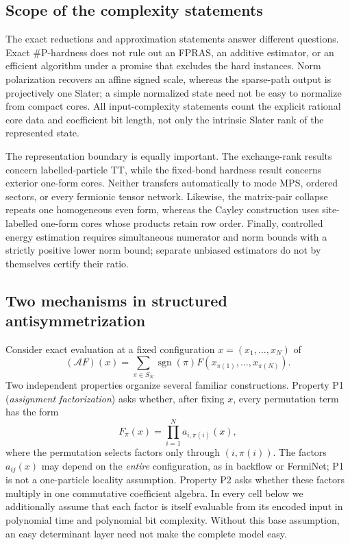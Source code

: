 \documentclass[aps,pra,reprint,superscriptaddress,nofootinbib,longbibliography,showkeys]{revtex4-2}
\theoremstyle{definition}
\begin{document}
\subsection{Scope of the complexity statements}

The exact reductions and approximation statements answer different questions.
Exact \#P-hardness does not rule out an FPRAS, an additive estimator, or an
efficient algorithm under a promise that excludes the hard instances.  Norm
polarization recovers an affine signed scale, whereas the sparse-path output is
projectively one Slater; a simple normalized state need not be easy to
normalize from compact cores.  All input-complexity statements count the
explicit rational core data and coefficient bit length, not only the intrinsic
Slater rank of the represented state.

The representation boundary is equally important.  The exchange-rank results
concern labelled-particle TT, while the fixed-bond hardness result concerns
exterior one-form cores.  Neither transfers automatically to mode MPS,
ordered sectors, or every fermionic tensor network.  Likewise, the
matrix-pair collapse repeats one homogeneous even form, whereas the Cayley
construction uses site-labelled one-form cores whose products retain row
order.  Finally, controlled energy estimation requires simultaneous numerator
and norm bounds with a strictly positive lower norm bound; separate unbiased
estimators do not by themselves certify their ratio.

\subsection{Two mechanisms in structured antisymmetrization}
\label{sec:two-mechanism-map}

Consider exact evaluation at a fixed configuration $x=(x_1,\ldots,x_N)$ of
\begin{equation}
 (\mathcal AF)(x)=\sum_{\pi\in S_N}\operatorname{sgn}(\pi)
 F(x_{\pi(1)},\ldots,x_{\pi(N)}).
 \label{eq:structured-antisymmetrizer}
\end{equation}
Two independent properties organize several familiar constructions.  Property
P1 (\emph{assignment factorization}) asks whether, after fixing $x$, every
permutation term has the form
\begin{equation}
 F_\pi(x)=\prod_{i=1}^N a_{i,\pi(i)}(x),
 \label{eq:p1}
\end{equation}
where the permutation selects factors only through $(i,\pi(i))$.  The factors
$a_{ij}(x)$ may depend on the \emph{entire} configuration, as in backflow or
FermiNet; P1 is not a one-particle locality assumption.  Property P2 asks
whether these factors multiply in one commutative coefficient algebra.  In
every cell below we additionally assume that each factor is itself evaluable
from its encoded input in polynomial time and polynomial bit complexity.
Without this base assumption, an easy determinant layer need not make the
complete model easy.
\end{document}
